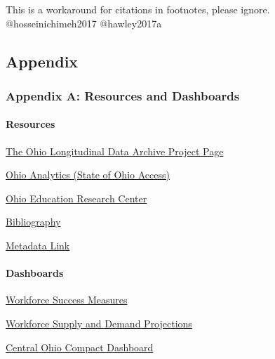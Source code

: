 \documentclass[
]{WileySix}
\begin{document}
\begin{invisible}
This is a workaround for citations in footnotes, please ignore.
@hosseinichimeh2017 @hawley2017a
\end{invisible}

\hypertarget{appendix-2}{%
\subsection*{Appendix}\label{appendix-2}}

\hypertarget{appendix-a-resources-and-dashboards}{%
\subsubsection*{Appendix A: Resources and Dashboards}\label{appendix-a-resources-and-dashboards}}

\hypertarget{resources}{%
\paragraph{Resources}\label{resources}}

\href{https://chrr.osu.edu/projects/ohio-longitudinal-data-archive}{The Ohio Longitudinal Data Archive Project Page}

\href{http://www.ohioanalytics.gov/}{Ohio Analytics (State of Ohio Access)}

\href{https://oerc.osu.edu/}{Ohio Education Research Center}

\href{https://www.chrr.ohio-state.edu/content/olda_bib/olda_bib.html}{Bibliography}

\href{https://www.chrr.ohio-state.edu/investigator/pages/search}{Metadata Link}

\hypertarget{dashboards}{%
\paragraph{Dashboards}\label{dashboards}}

\href{https://workforcesuccess.chrr.ohio-state.edu/}{Workforce Success Measures}

\href{https://workforcedatatools.chrr.ohio-state.edu/home}{Workforce Supply and Demand Projections}

\href{https://compact.chrr.ohio-state.edu/}{Central Ohio Compact Dashboard}
\end{document}
